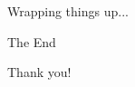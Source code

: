 \documentclass{beamer}
\begin{document}
\begin{frame}{Wrapping things up...}
\begin{center}
{
            }
        \end{center}
    \end{frame}
    \begin{frame}{The End}
        \begin{center}
            Thank you!
        \end{center}
    \end{frame}
\end{document}
